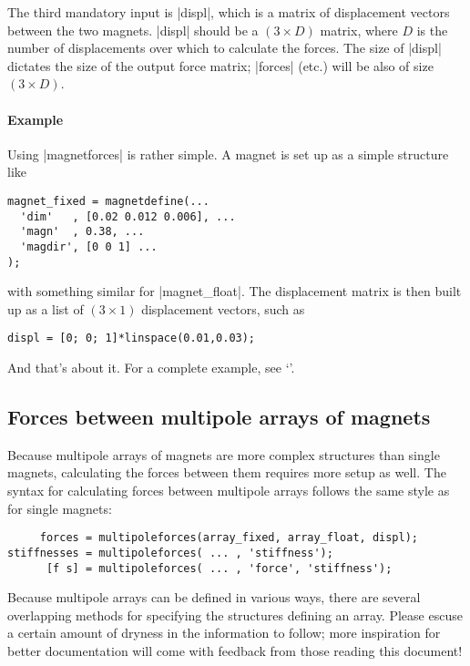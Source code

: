 \documentclass{article}
\begin{document}
The third mandatory input is |displ|, which is a matrix of displacement vectors between the two magnets. |displ| should be a $(3\times D)$ matrix,
where $D$ is the number of displacements over which to calculate the forces.
The size of |displ| dictates the size of the output force matrix; |forces| (etc.) will be also of size $(3\times D)$.

\paragraph{Example} Using |magnetforces| is rather simple. A magnet is set up
as a simple structure like
\begin{verbatim}
magnet_fixed = magnetdefine(...
  'dim'   , [0.02 0.012 0.006], ...
  'magn'  , 0.38, ...
  'magdir', [0 0 1] ...
);
\end{verbatim}
with something similar for |magnet_float|. The displacement matrix is then
built up as a list of $(3\times1)$ displacement vectors, such as
\begin{verbatim}
displ = [0; 0; 1]*linspace(0.01,0.03);
\end{verbatim}
And that's about it.
For a complete example, see `'.


\subsection{Forces between multipole arrays of magnets}

Because multipole arrays of magnets are more complex structures than single magnets, calculating the forces between them requires more setup as well.
The syntax for calculating forces between multipole arrays follows the same style as for single magnets:

\begin{verbatim}
     forces = multipoleforces(array_fixed, array_float, displ);
stiffnesses = multipoleforces( ... , 'stiffness');
      [f s] = multipoleforces( ... , 'force', 'stiffness');
\end{verbatim}

Because multipole arrays can be defined in various ways, there are several
overlapping methods for specifying the structures defining an array. Please escuse a certain amount of dryness in the information to follow; more inspiration for better documentation will come with feedback from those reading this document!
\end{document}

